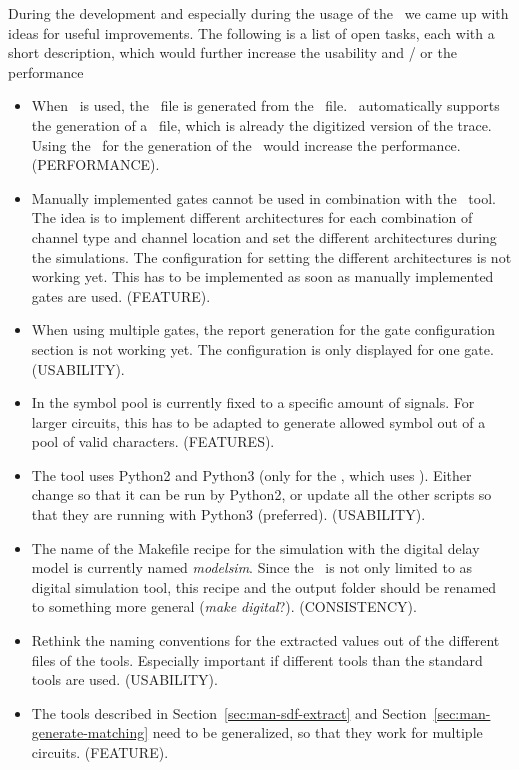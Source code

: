 During the development and especially during the usage of the \invt\, we came 
up with ideas for useful improvements. 
The following is a list of open tasks, each with a short description, which 
would further increase the usability and / or the performance

\begin{itemize}
	\item When \hspice\ is used, the \crossingsjson\ file is 
	generated from the \trfile\ file. \hspice\ automatically supports the 
	generation of a \vcdfile\ file, which is already the digitized version of 
	the trace. Using the \vcdfile\ for the generation of the \crossingsjson\ 
	would increase the performance. (PERFORMANCE).
	
	\item Manually implemented gates cannot be used in combination with the 
	\multiexec\ tool. The idea is to implement different architectures for 
	each combination of channel type and channel location and set the 
	different architectures during the simulations. The configuration for 
	setting the different architectures is not working yet. This has to be 
	implemented as soon as manually implemented gates are used. (FEATURE).
	
	\item When using multiple gates, the report generation for the gate 
	configuration section is not working yet. The configuration is only 
	displayed for one gate. (USABILITY).
	
	\item In  the symbol pool is currently fixed to a specific 
	amount of signals. For larger circuits, this has to be adapted to generate 
	allowed symbol out of a pool of valid characters. (FEATURES).
	
	\item The tool uses Python2 and Python3 (only for the , 
	which uses ). Either change \file{rawread.py} so that it 
	can be run by Python2, or update all the other scripts so that they are 
	running with Python3 (preferred). (USABILITY).
	
	\item The name of the Makefile recipe for the simulation with the digital 
	delay model is currently named \emph{modelsim}. Since the \invt\ is not 
	only limited to \modelsim as digital simulation tool, this recipe and the 
	output folder should be renamed to something more general (\emph{make 
	digital}?). (CONSISTENCY).

	\item Rethink the naming conventions for the extracted values out of the 
	different files of the tools. Especially important if different tools than 
	the standard tools are used. (USABILITY).
	
	\item The tools described in Section~\ref{sec:man-sdf-extract} and 
	Section~\ref{sec:man-generate-matching} need to be generalized, so that 
	they work for multiple circuits. (FEATURE).
\end{itemize}

